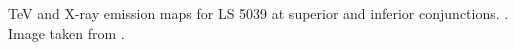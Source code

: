 TeV and X-ray emission maps for LS 5039 at superior and inferior conjunctions. \label{fig:simu_gamma1}. Image taken from \citet{2015A&A...581A..27D}.